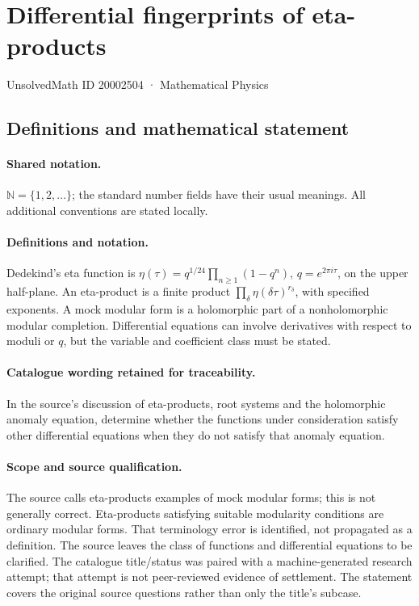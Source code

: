 \documentclass[11pt]{article}
\begin{document}
\setcounter{section}{20002503}
\section{Differential fingerprints of eta-products}\label{20002504}
{\small UnsolvedMath ID 20002504 · Mathematical Physics}
\subsection{Definitions and mathematical statement}

\paragraph{Shared notation.}$\mathbb N=\{1,2,\ldots\}$; the standard number fields have their usual meanings. All additional conventions are stated locally.


\paragraph{Definitions and notation.}Dedekind’s eta function is $\eta(\tau)=q^{1/24}\prod_{n\ge1}(1-q^n)$, $q=e^{2\pi i\tau}$, on the upper half-plane. An eta-product is a finite product $\prod_\delta\eta(\delta\tau)^{r_\delta}$, with specified exponents. A mock modular form is a holomorphic part of a nonholomorphic modular completion. Differential equations can involve derivatives with respect to moduli or $q$, but the variable and coefficient class must be stated.

\paragraph{Catalogue wording retained for traceability.}
In the source’s discussion of eta-products, root systems and the holomorphic anomaly equation, determine whether the functions under consideration satisfy other differential equations when they do not satisfy that anomaly equation.
\paragraph{Scope and source qualification.}The source calls eta-products examples of mock modular forms; this is not generally correct. Eta-products satisfying suitable modularity conditions are ordinary modular forms. That terminology error is identified, not propagated as a definition. The source leaves the class of functions and differential equations to be clarified. The catalogue title/status was paired with a machine-generated research attempt; that attempt is not peer-reviewed evidence of settlement. The statement covers the original source questions rather than only the title’s subcase.
\end{document}
